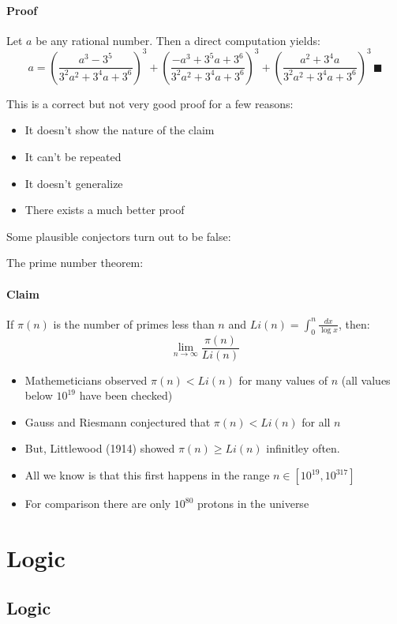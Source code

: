 \documentclass{article}
\begin{document}
\paragraph{Proof} Let \(a\) be any rational number. Then a direct computation yields:
\[a=\left(\frac{a^3-3^5}{3^2a^2+3^4a+3^6}\right)^3+\left(\frac{-a^3+3^5a+3^6}{3^2a^2+3^4a+3^6}\right)^3+\left(\frac{a^2+3^4a}{3^2a^2+3^4a+3^6}\right)^3\,\blacksquare\]

This is a correct but not very good proof for a few reasons:
\begin{itemize}
\item It doesn't show the nature of the claim
\item It can't be repeated
\item It doesn't generalize
\item There exists a much better proof
\end{itemize}

Some plausible conjectors turn out to be false:

The prime number theorem:

\paragraph{Claim} If \(\pi(n)\) is the number of primes less than \(n\) and \(Li(n)=\int_0^n\frac{dx}{\log x}\), then:
\[\lim_{n\to\infty}\frac{\pi(n)}{Li(n)}\]
\begin{itemize}
\item Mathemeticians observed \(\pi(n)<Li(n)\) for many values of \(n\) (all values below \(10^{19}\) have been checked)
\item Gauss and Riesmann conjectured that \(\pi(n)<Li(n)\) for all \(n\)
\item But, Littlewood (1914) showed \(\pi(n)\ge Li(n)\) infinitley often.
\item All we know is that this first happens in the range \(n\in[10^{19},10^{317}]\)
\item For comparison there are only \(10^{80}\) protons in the universe
\end{itemize}

\section{Logic}

\subsection*{Logic}
\end{document}

